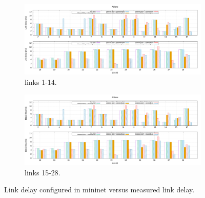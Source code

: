 \documentclass[10pt, journal, letterpaper]{IEEEtran}
\begin{document}
\begin{figure}
    \begin{subfigure}{\columnwidth}
      \centering
      \includegraphics[width=\columnwidth]{img/eval_Abilene_link_delay_real_and_measured.png}
      \caption{links 1-14.}
      \label{fig:real_delay_abile_p1}
    \end{subfigure}
    \begin{subfigure}{\columnwidth}
      \centering
      \includegraphics[width=\columnwidth]{img/eval_Abilene_link_delay_real_and_measured.png}
     \caption{links 15-28.}
     \label{fig:real_delay_abile_p2}
    \end{subfigure}
    \caption{Link delay configured in mininet versus measured link delay.}
    \label{fig:real_delay_abile}
\end{figure}
\end{document}
